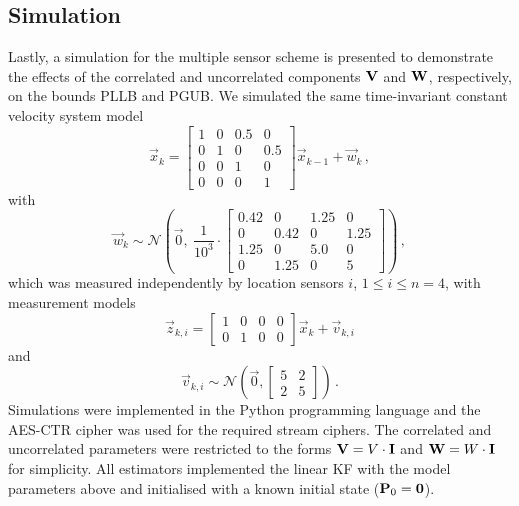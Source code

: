 \subsection{Simulation}\label{subsec:priv_estimation:fus_simulation}
Lastly, a simulation for the multiple sensor scheme is presented to demonstrate the effects of the correlated and uncorrelated components ${{\mathbf{V}}}$ and ${{\mathbf{W}}}$, respectively, on the bounds PLLB and PGUB. We simulated the same time-invariant constant velocity system model
\begin{equation}
    \vec{x}_k =
    \begin{bmatrix}
        1 & 0 & 0.5 & 0\\
        0 & 1 & 0 & 0.5\\
        0 & 0 & 1 & 0\\
        0 & 0 & 0 & 1
    \end{bmatrix}
    \vec{x}_{k-1} + \vec{w}_k\,,
\end{equation}
with
\begin{equation}
    \vec{w}_k \sim \mathcal{N}\left(\vec{0},\ \frac{1}{10^{3}}\cdot
    \begin{bmatrix}
        0.42 & 0 & 1.25 & 0\\
        0 & 0.42 & 0 & 1.25\\
        1.25 & 0 & 5.0 & 0\\
        0 & 1.25 & 0 & 5
    \end{bmatrix}\right)\,,
\end{equation}
which was measured independently by location sensors $i$, $1\leq i\leq n=4$, with measurement models
\begin{equation}
  \vec{z}_{k,i}=
  \begin{bmatrix}
     1 & 0 & 0 & 0\\
     0 & 1 & 0 & 0
  \end{bmatrix}
  \vec{x}_k + \vec{v}_{k,i}
\end{equation}
and
\begin{equation}
  \vec{v}_{k,i}\sim\mathcal{N}\left(\vec{0},
  \begin{bmatrix}
     5 & 2\\
     2 & 5
  \end{bmatrix}\right)\,.
\end{equation}
Simulations were implemented in the Python programming language and the AES-CTR cipher was used for the required stream ciphers. The correlated and uncorrelated parameters were restricted to the forms ${{\mathbf{V}}}=V\cdot{\ensuremath{{\mathbf{I}}}}$ and ${{\mathbf{W}}}=W\cdot{\ensuremath{{\mathbf{I}}}}$ for simplicity. All estimators implemented the linear KF with the model parameters above and initialised with a known initial state (${{\mathbf{P}}}_0={{\mathbf{0}}}$).

